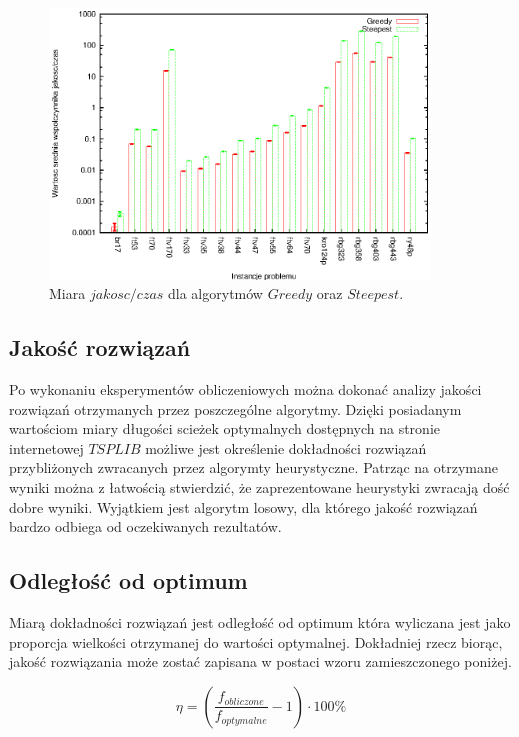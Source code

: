 \begin{figure}
\begin{center}
\includegraphics[width=0.9\textwidth]{wykresy/steepest_greedy_jc}
\end{center}
\caption{Miara $jakosc/czas$ dla algorytmów $Greedy$ oraz $Steepest$.}
\label{steepest_greedy_jc}
\end{figure}

\subsection{Jakość rozwiązań}

Po wykonaniu eksperymentów obliczeniowych można dokonać analizy jakości
rozwiązań otrzymanych przez poszczególne algorytmy. Dzięki posiadanym
wartościom miary długości scieżek optymalnych dostępnych na
stronie internetowej $TSPLIB$ możliwe jest określenie dokładności
rozwiązań przybliżonych zwracanych przez algorymty heurystyczne. Patrząc
na otrzymane wyniki można z łatwością stwierdzić, że zaprezentowane
heurystyki zwracają dość dobre wyniki. Wyjątkiem jest algorytm
losowy, dla którego jakość rozwiązań bardzo odbiega od oczekiwanych
rezultatów.

\subsection{Odległość od optimum}

Miarą dokładności rozwiązań jest odległość od optimum
która wyliczana jest jako proporcja wielkości otrzymanej
do wartości optymalnej. Dokładniej rzecz biorąc, jakość rozwiązania
może zostać zapisana w postaci wzoru zamieszczonego poniżej.


$$
\eta =
\left (\frac{f_{obliczone}}{f_{optymalne}} - 1\right )\cdot 100 \%
$$

